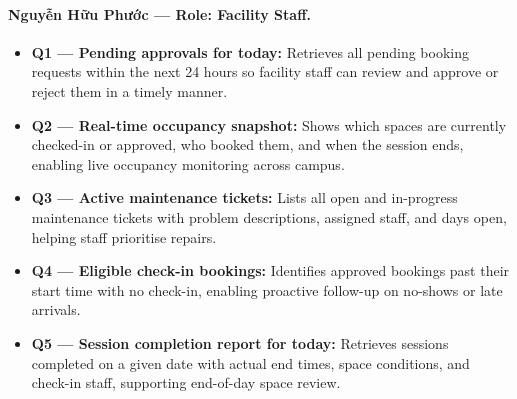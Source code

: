 \paragraph{Nguyễn Hữu Phước --- Role: Facility Staff.}
\begin{itemize}[noitemsep]

    \item \textbf{Q1 --- Pending approvals for today:} Retrieves all pending booking requests within the next 24 hours so facility staff can review and approve or reject them in a timely manner.

\item \textbf{Q2 --- Real-time occupancy snapshot:} Shows which spaces are currently checked-in or approved, who booked them, and when the session ends, enabling live occupancy monitoring across campus.

\item \textbf{Q3 --- Active maintenance tickets:} Lists all open and in-progress maintenance tickets with problem descriptions, assigned staff, and days open, helping staff prioritise repairs.

\item \textbf{Q4 --- Eligible check-in bookings:} Identifies approved bookings past their start time with no check-in, enabling proactive follow-up on no-shows or late arrivals.

\item \textbf{Q5 --- Session completion report for today:} Retrieves sessions completed on a given date with actual end times, space conditions, and check-in staff, supporting end-of-day space review.
\end{itemize}
